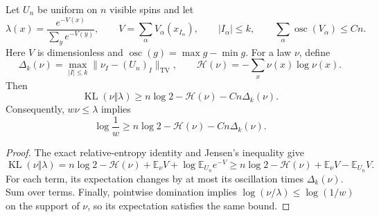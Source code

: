 \begin{lemma}
\label{ian:thermal-entropy-obstruction}
Let \(U_n\) be uniform on \(n\) visible spins and let
\[
 \lambda(x)=\frac{e^{-V(x)}}{\sum_y e^{-V(y)}},
 \qquad
 V=\sum_\alpha V_\alpha(x_{I_\alpha}),
 \qquad |I_\alpha|\le k,
 \qquad
 \sum_\alpha\operatorname{osc}(V_\alpha)\le Cn.
 \tag{36.10}\label{ian:thermal-effective-potentials}
\]
Here \(V\) is dimensionless and
\(\operatorname{osc}(g)=\max g-\min g\).
For a law \(\nu\), define
\[
 \Delta_k(\nu)=
 \max_{|I|\le k}\|\nu_I-(U_n)_I\|_{\mathrm{TV}},
 \qquad
 \mathcal H(\nu)=-\sum_x\nu(x)\log\nu(x).
 \tag{36.11}
\]
Then
\[
 \operatorname{KL}(\nu\Vert\lambda)
 \ge n\log2-\mathcal H(\nu)-Cn\Delta_k(\nu).
 \tag{36.12}
\]
Consequently, \(w\nu\le\lambda\) implies
\[
 \log\frac1w
 \ge n\log2-\mathcal H(\nu)-Cn\Delta_k(\nu).
 \tag{36.13}
\]
\end{lemma}

\begin{proof}
The exact relative-entropy identity and Jensen's inequality give
\[
 \operatorname{KL}(\nu\Vert\lambda)
 =n\log2-\mathcal H(\nu)
   +\mathbb E_\nu V+\log\mathbb E_{U_n}e^{-V}
 \ge n\log2-\mathcal H(\nu)
   +\mathbb E_\nu V-\mathbb E_{U_n}V.
 \tag{36.14}
\]
For each term, its expectation changes by at most its oscillation
times \(\Delta_k(\nu)\). Sum over terms.
Finally, pointwise domination implies
\(\log(\nu/\lambda)\le\log(1/w)\) on the support of \(\nu\), so its
expectation satisfies the same bound.
\end{proof}

